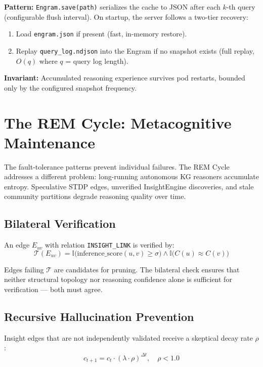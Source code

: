 \documentclass[10pt,twocolumn]{article}
\begin{document}
\textbf{Pattern:} \texttt{Engram.save(path)} serializes the cache to JSON after each
$k$-th query (configurable flush interval). On startup, the server follows a two-tier
recovery:
\begin{enumerate}
  \item Load \texttt{engram.json} if present (fast, in-memory restore).
  \item Replay \texttt{query\_log.ndjson} into the Engram if no snapshot exists
        (full replay, $O(q)$ where $q$ = query log length).
\end{enumerate}

\textbf{Invariant:} Accumulated reasoning experience survives pod restarts, bounded
only by the configured snapshot frequency.

\section{The REM Cycle: Metacognitive Maintenance}
\label{sec:rem}

The fault-tolerance patterns prevent individual failures. The REM Cycle addresses a
different problem: long-running autonomous KG reasoners accumulate entropy. Speculative
STDP edges, unverified InsightEngine discoveries, and stale community partitions degrade
reasoning quality over time.

\subsection{Bilateral Verification}

An edge $E_{uv}$ with relation \texttt{INSIGHT\_LINK} is verified by:
\begin{equation}
\mathcal{T}(E_{uv}) = \mathbb{I}\bigl(\mathrm{inference\_score}(u,v) \geq \sigma\bigr)
\wedge \mathbb{I}\bigl(C(u) \approx C(v)\bigr)
\label{eq:triangulation}
\end{equation}

Edges failing $\mathcal{T}$ are candidates for pruning. The bilateral check ensures
that neither structural topology nor reasoning confidence alone is sufficient for
verification — both must agree.

\subsection{Recursive Hallucination Prevention}

Insight edges that are not independently validated receive a skeptical decay rate $\rho$:
\begin{equation}
c_{t+1} = c_t \cdot (\lambda \cdot \rho)^{\Delta t}, \quad \rho < 1.0
\label{eq:insight_decay}
\end{equation}
\end{document}

